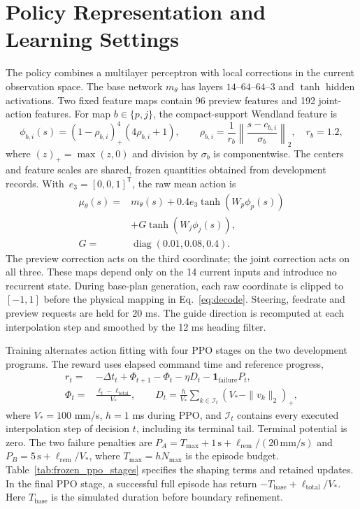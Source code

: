 \documentclass[pdflatex,sn-apa]{sn-jnl}
\begin{document}
\section{Policy Representation and Learning Settings}
\label{app:learning}
The policy combines a multilayer perceptron with local corrections in the current observation space. The base network $m_\theta$ has layers $14$--$64$--$64$--$3$ and $\tanh$ hidden activations. Two fixed feature maps contain 96 preview features and 192 joint-action features. For map $b\in\{p,j\}$, the compact-support Wendland feature is
\begin{equation}
\phi_{b,i}(s)=(1-\rho_{b,i})_+^4(4\rho_{b,i}+1),
\qquad
\rho_{b,i}=\frac{1}{r_b}\left\|\frac{s-c_{b,i}}{\sigma_b}\right\|_2,
\quad r_b=1.2,
\label{eq:frozen_wendland}
\end{equation}
where $(z)_+=\max(z,0)$ and division by $\sigma_b$ is componentwise. The centers and feature scales are shared, frozen quantities obtained from development records. \mbox{With $e_3=[0,0,1]^{\mathsf T}$}, the raw mean action is
\begin{equation}
\begin{aligned}
\mu_\theta(s)={}&m_\theta(s)+0.4e_3\tanh\!\left(W_p\phi_p(s)\right)\\
&+G\tanh\!\left(W_j\phi_j(s)\right),\\
G={}&\operatorname{diag}(0.01,0.08,0.4).
\end{aligned}
\label{eq:policy_mean_main}
\end{equation}
The preview correction acts on the third coordinate; the joint correction acts on all three. These maps depend only on the 14 current inputs and introduce no recurrent state. During base-plan generation, each raw coordinate is clipped to $[-1,1]$ before the physical mapping in Eq.~\eqref{eq:decode}. Steering, feedrate and preview requests are held for 20 ms. The guide direction is recomputed at each interpolation step and smoothed by the 12 ms heading filter.

Training alternates action fitting with four PPO stages on the two development programs. The reward uses elapsed command time and reference progress,
\begin{equation}
\begin{split}
r_t={}&-\Delta t_t+\Phi_{t+1}-\Phi_t
-\eta D_t-\mathbf{1}_{\mathrm{failure}}P_t,\\
\Phi_t={}&\frac{\ell_t-\ell_{\mathrm{total}}}{V_*},
\qquad
D_t=\frac{h}{V_*}\sum_{k\in\mathcal I_t}(V_*-\|v_k\|_2)_+,
\end{split}
\label{eq:training_reward_stages}
\end{equation}
where $V_*=100$ mm/s, $h=1$ ms during PPO, and $\mathcal I_t$ contains every executed interpolation step of decision $t$, including its terminal tail. Terminal potential is zero. The two failure penalties are $P_A=T_{\max}+1\,\mathrm{s}+\ell_{\mathrm{rem}}/(20\,\mathrm{mm/s})$ and $P_B=5\,\mathrm{s}+\ell_{\mathrm{rem}}/V_*$, where $T_{\max}=hN_{\max}$ is the episode budget. Table~\ref{tab:frozen_ppo_stages} specifies the shaping terms and retained updates. In the final PPO stage, a successful full episode has return $-T_{\mathrm{base}}+\ell_{\mathrm{total}}/V_*$. Here $T_{\mathrm{base}}$ is the simulated duration before boundary refinement.
\end{document}
